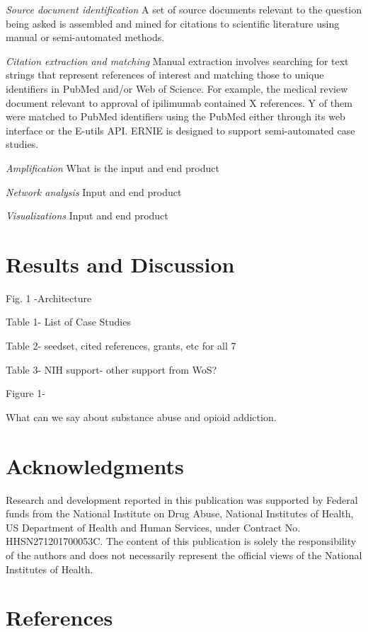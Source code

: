 \documentclass[review]{elsarticle}
\begin{document}
\emph {Source document identification} A set of source documents relevant to the question being asked is assembled and mined for citations to scientific literature using manual or semi-automated methods. 

\emph {Citation extraction and matching} Manual extraction involves searching for text strings that represent references of interest and matching those to unique identifiers in PubMed and/or Web of Science. For example, the medical review document relevant to approval of ipilimumab contained X references. Y of them were matched to PubMed identifiers using the PubMed either through its web interface or the E-utils API. ERNIE is designed to support semi-automated case studies.

\emph {Amplification} What is the input and end product

\emph{Network analysis} Input and end product

\emph{Visualizations} Input and end product

\section*{Results and Discussion}

Fig. 1 -Architecture

Table 1- List of Case Studies

Table 2- seedset, cited references, grants, etc for all 7 

Table 3- NIH support- other support from WoS?

Figure 1- 

What can we say about substance abuse and opioid addiction. 


\section*{Acknowledgments} Research and development reported in this publication was supported by Federal funds from the National Institute on Drug Abuse, National Institutes of Health, US Department of Health and Human Services, under Contract No. HHSN271201700053C. The content of this publication is solely the responsibility of the authors and does not necessarily represent the official views of the National Institutes of Health.


\section*{References}
\end{document}
